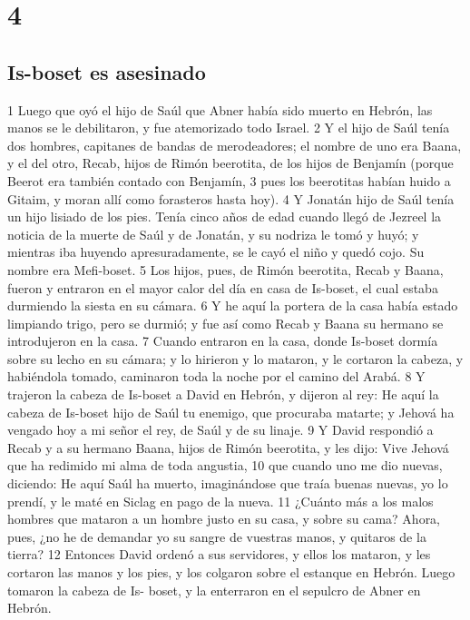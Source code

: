 \chapter{4}

\section*{Is-boset es asesinado}

1 Luego que oyó el hijo de Saúl que Abner había sido muerto en Hebrón, las manos se le debilitaron, y fue atemorizado todo Israel.
2 Y el hijo de Saúl tenía dos hombres, capitanes de bandas de merodeadores; el nombre de uno era Baana, y el del otro, Recab, hijos de Rimón beerotita, de los hijos de Benjamín (porque Beerot era también contado con Benjamín,
3 pues los beerotitas habían huido a Gitaim, y moran allí como forasteros hasta hoy).
4 Y Jonatán hijo de Saúl tenía un hijo lisiado de los pies. Tenía cinco años de edad cuando llegó de Jezreel la noticia de la muerte de Saúl y de Jonatán, y su nodriza le tomó y huyó; y mientras iba huyendo apresuradamente, se le cayó el niño y quedó cojo. Su nombre era Mefi-boset.
5 Los hijos, pues, de Rimón beerotita, Recab y Baana, fueron y entraron en el mayor calor del día en casa de Is-boset, el cual estaba durmiendo la siesta en su cámara.
6 Y he aquí la portera de la casa había estado limpiando trigo, pero se durmió; y fue así como Recab y Baana su hermano se introdujeron en la casa.
7 Cuando entraron en la casa, donde Is-boset dormía sobre su lecho en su cámara; y lo hirieron y lo mataron, y le cortaron la cabeza, y habiéndola tomado, caminaron toda la noche por el camino del Arabá.
8 Y trajeron la cabeza de Is-boset a David en Hebrón, y dijeron al rey: He aquí la cabeza de Is-boset hijo de Saúl tu enemigo, que procuraba matarte; y Jehová ha vengado hoy a mi señor el rey, de Saúl y de su linaje.
9 Y David respondió a Recab y a su hermano Baana, hijos de Rimón beerotita, y les dijo: Vive Jehová que ha redimido mi alma de toda angustia,
10 que cuando uno me dio nuevas, diciendo: He aquí Saúl ha muerto, imaginándose que traía buenas nuevas, yo lo prendí, y le maté en Siclag en pago de la nueva. 
11 ¿Cuánto más a los malos hombres que mataron a un hombre justo en su casa, y sobre su cama? Ahora, pues, ¿no he de demandar yo su sangre de vuestras manos, y quitaros de la tierra? 
12 Entonces David ordenó a sus servidores, y ellos los mataron, y les cortaron las manos y los pies, y los colgaron sobre el estanque en Hebrón. Luego tomaron la cabeza de Is- boset, y la enterraron en el sepulcro de Abner en Hebrón.

